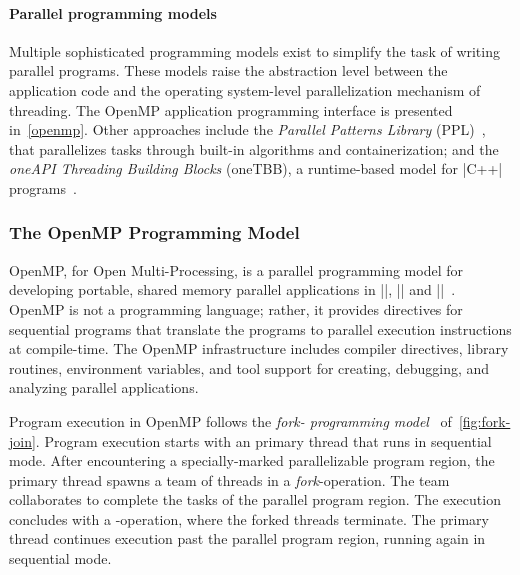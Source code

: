 \paragraph*{Parallel programming models}
Multiple sophisticated programming models exist to simplify the task of writing parallel programs.
These models raise the abstraction level between the application code and the operating system-level parallelization mechanism of threading.
The OpenMP
application programming interface is presented in~\autoref{openmp}.
Other approaches include the
\emph{Parallel Patterns Library} (PPL)~\cite{ppl2021,campbell2011},
that parallelizes tasks through built-in algorithms and containerization;
and the \emph{oneAPI Threading Building Blocks} (oneTBB),
a runtime-based model for \pr|C++| programs~\cite{onetbb}.

\subsubsection{The OpenMP Programming Model}
\label{openmp}

{OpenMP}, for Open Multi-Processing,
is a parallel programming model for developing portable, shared memory parallel applications in
\pr||,
\pr|| and
\pr||~\cite{openmp_api}.
OpenMP is not a programming language;
rather, it provides directives for sequential programs that translate the programs to parallel execution instructions at compile-time.
The OpenMP infrastructure includes compiler directives, library routines, environment variables, and tool support for creating, debugging, and analyzing parallel applications.

Program execution in OpenMP follows the \emph{fork- programming model}~\cite[p. 24]{chapman2007} of~\autoref{fig:fork-join}.
Program execution starts with an {primary thread}
that runs in sequential mode.
After encountering a specially-marked parallelizable program region, the primary thread spawns a team of threads in a \emph{fork}-operation.
The team collaborates to complete the tasks of the parallel program region.
The execution concludes with a \emph{}-operation, where the forked threads terminate.
The primary thread continues execution past the parallel program region, running again in sequential mode.

